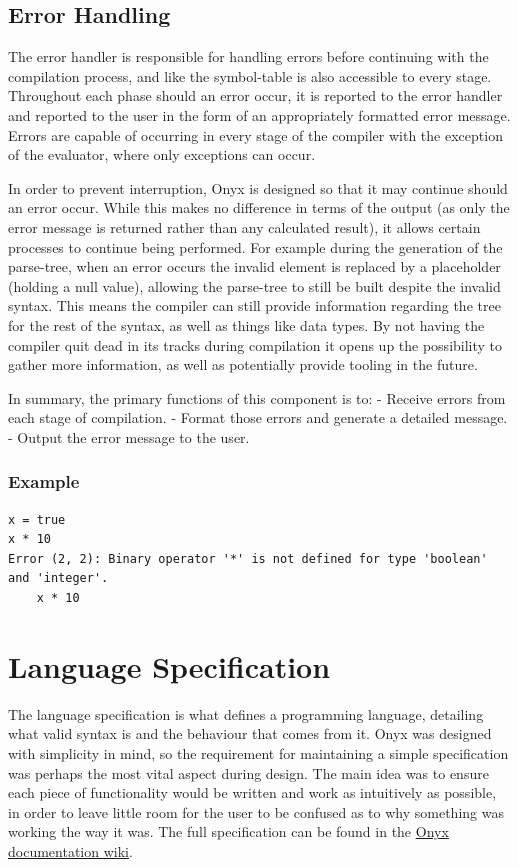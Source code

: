 \documentclass[
]{report}
\begin{document}
\subsection{Error Handling}
The error handler is responsible for handling errors before continuing
with the compilation process, and like the \gls{symbol-table} is also
accessible to every stage. Throughout each phase should an error occur,
it is reported to the error handler and reported to the user in the form
of an appropriately formatted error message. Errors are capable of
occurring in every stage of the compiler with the exception of the
evaluator, where only exceptions can occur.

In order to prevent interruption, Onyx is designed so that it may
continue should an error occur. While this makes no difference in terms
of the output (as only the error message is returned rather than any
calculated result), it allows certain processes to continue being
performed. For example during the generation of the \gls{parse-tree}, when an
error occurs the invalid element is replaced by a placeholder (holding a
null value), allowing the \gls{parse-tree} to still be built despite the
invalid syntax. This means the compiler can still provide information
regarding the tree for the rest of the syntax, as well as things like
data types. By not having the compiler quit dead in its tracks during
compilation it opens up the possibility to gather more information, as
well as potentially provide tooling in the future.

In summary, the primary functions of this component is to: - Receive
errors from each stage of compilation. - Format those errors and
generate a detailed message. - Output the error message to the user.

\subsubsection{Example}
\begin{verbatim}
x = true
x * 10
Error (2, 2): Binary operator '*' is not defined for type 'boolean' and 'integer'.
    x * 10
\end{verbatim}

\section{Language Specification}
The language specification is what defines a programming language,
detailing what valid syntax is and the behaviour that comes from it.
Onyx was designed with simplicity in mind, so the requirement for
maintaining a simple specification was perhaps the most vital aspect
during design. The main idea was to ensure each piece of functionality
would be written and work as intuitively as possible, in order to leave
little room for the user to be confused as to why something was working
the way it was. The full specification can be found in the
\href{https://github.com/louislefevre/onyx-compiler/wiki}{Onyx
documentation wiki}.
\end{document}
